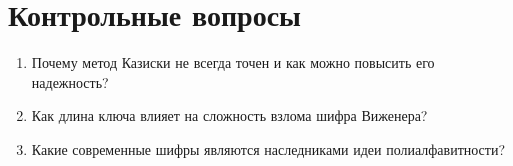 \section*{Контрольные вопросы}

\begin{enumerate}
    \item Почему метод Казиски не всегда точен и как можно повысить его надежность?
    \item Как длина ключа влияет на сложность взлома шифра Виженера?
    \item Какие современные шифры являются наследниками идеи полиалфавитности?
\end{enumerate}
